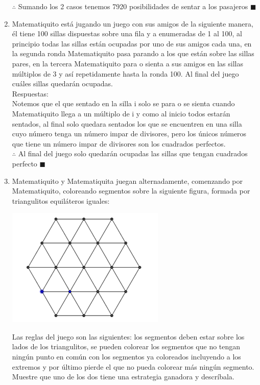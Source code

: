 \documentclass{book}
\begin{document}
\begin{enumerate}
				$\therefore$ Sumando los 2 casos tenemos 7920 posibilidades de sentar a los pasajeros $\blacksquare$\\
				\item Matematiquito está jugando un juego con sus amigos de la siguiente manera, él tiene 100 sillas dispuestas sobre una fila y a enumeradas de 1 al 100, al principio todas las sillas están ocupadas por uno de sus amigos cada una, en la segunda ronda Matematiquito pasa parando a los que están sobre las sillas pares, en la tercera Matematiquito para o sienta a sus amigos en las sillas múltiplos de 3 y así repetidamente hasta la ronda 100. Al final del juego cuáles sillas quedarán ocupadas.\\
				Respuestas:\\
				Notemos que el que sentado en la silla i solo se para o se sienta cuando Matematiquito llega a un múltiplo de i y como al inicio todos estarán sentados, al final solo quedara sentados los que se encuentren en una silla cuyo número tenga un número impar de divisores, pero los únicos números que tiene un número impar de divisores son los cuadrados perfectos.\\
				$\therefore$ Al final del juego solo quedarán ocupadas las sillas que tengan cuadrados perfecto $\blacksquare$\\
				\item Matematiquito y Matematiquita juegan alternadamente, comenzando por Matematiquito, coloreando segmentos sobre la siguiente figura, formada por triangulitos equiláteros iguales:
					\begin{center}
						\includegraphics[scale=1]{imagenes/Combinatoria/11.png}
					\end{center}
				Las reglas del juego son las siguientes: los segmentos deben estar sobre los lados de los triangulitos, se pueden colorear los segmentos que no tengan ningún punto en común con los segmentos ya coloreados incluyendo a los extremos y por último pierde el que no pueda colorear más ningún segmento. Muestre que uno de los dos tiene una estrategia ganadora y descríbala.\\

\end{enumerate}
\end{document}
